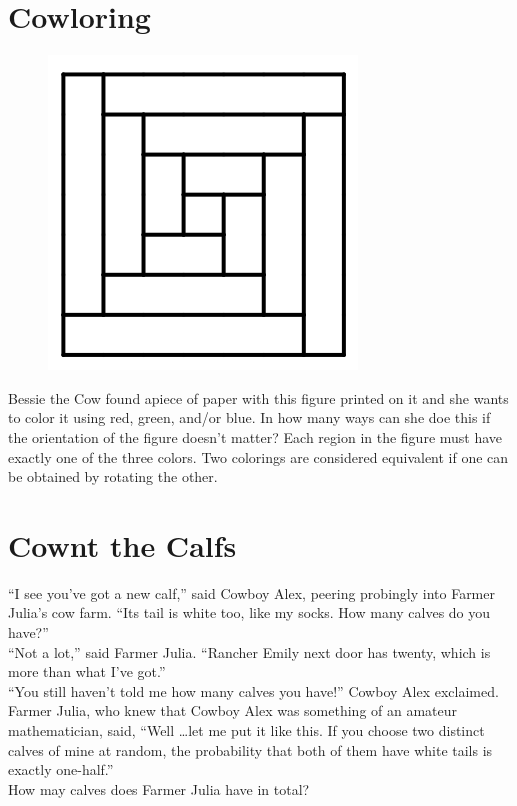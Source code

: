 \documentclass{article}
\begin{document}
\section*{Cowloring}
\begin{figure}
    \vspace{-20pt}
    \centering
    \includegraphics[scale=0.35]{cowloring.png}
    \vspace{-20pt}
\end{figure}
Bessie the Cow found apiece of paper with this figure printed on it and she wants to color it using red, green, and/or blue.
In how many ways can she doe this if the orientation of the figure doesn't matter?
Each region in the figure must have exactly one of the three colors.
Two colorings are considered equivalent if one can be obtained by rotating the other.

\section*{Cownt the Calfs}
``I see you've got a new calf,'' said Cowboy Alex, peering probingly into Farmer Julia's cow farm.
``Its tail is white too, like my socks.
How many calves do you have?'' \\[0.25cm]
``Not a lot,'' said Farmer Julia.
``Rancher Emily next door has twenty, which is more than what I've got.'' \\[0.25cm]
``You still haven't told me how many calves you have!'' Cowboy Alex exclaimed. \\[0.25cm]
Farmer Julia, who knew that Cowboy Alex was something of an amateur mathematician, said, ``Well \ldots let me put it like this.
If you choose two distinct calves of mine at random, the probability that both of them have white tails is exactly one-half.'' \\[0.25cm]
How may calves does Farmer Julia have in total?
\end{document}

